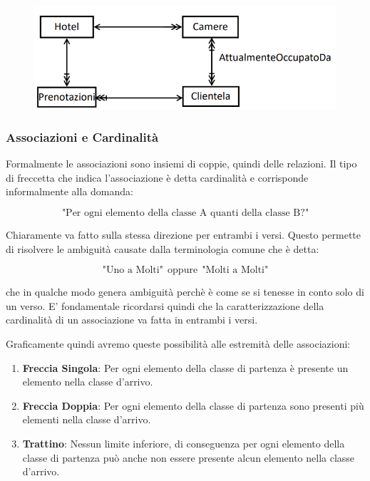 \documentclass{article}
\begin{document}
\begin{figure}[htbp]
    \center
    \includegraphics[scale=0.6]{img/esempioRelazione1.png}
\end{figure}

\subsubsection{Associazioni e Cardinalità}

Formalmente le associazioni sono insiemi di coppie, quindi delle relazioni. Il tipo di freccetta che indica l'associazione
è detta cardinalità e corrisponde informalmente alla domanda:

\[ \text{"Per ogni elemento della classe A quanti della classe B?"} \]

Chiaramente va fatto sulla stessa direzione per entrambi i versi. Questo permette di risolvere le ambiguità causate dalla terminologia comune che è detta:

\[ \text{"Uno a Molti"} \:\: \text{oppure} \:\: \text{"Molti a Molti"} \]

che in qualche modo genera ambiguità perchè è come se si tenesse in conto solo di un verso. E' fondamentale ricordarsi quindi che la caratterizzazione della cardinalità di un associazione va
fatta in entrambi i versi.

Graficamente quindi avremo queste possibilità alle estremità delle associazioni:

\begin{enumerate}
    \item \textbf{Freccia Singola}: Per ogni elemento della classe di partenza è presente un elemento nella classe d'arrivo.
    \item \textbf{Freccia Doppia}: Per ogni elemento della classe di partenza sono presenti più elementi nella classe d'arrivo.
    \item \textbf{Trattino}: Nessun limite inferiore, di conseguenza per ogni elemento della classe di partenza può anche non essere presente alcun elemento nella classe d'arrivo.
\end{enumerate}
\end{document}
